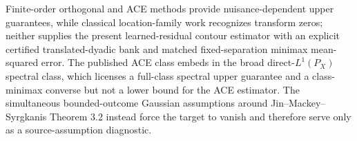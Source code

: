 Finite-order orthogonal and ACE methods provide nuisance-dependent upper guarantees, while classical location-family work recognizes transform zeros; neither supplies the present learned-residual contour estimator with an explicit certified translated-dyadic bank and matched fixed-separation minimax mean-squared error.  The published ACE class embeds in the broad direct-\(L^1(P_X)\) spectral class, which licenses a full-class spectral upper guarantee and a class-minimax converse but not a lower bound for the ACE estimator.  The simultaneous bounded-outcome Gaussian assumptions around Jin--Mackey--Syrgkanis Theorem 3.2 instead force the target to vanish and therefore serve only as a source-assumption diagnostic.